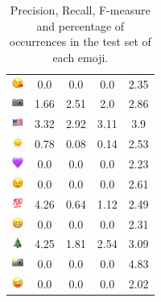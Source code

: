 \documentclass{article}
\begin{document}
\begin{table}
\begin{tabular}{|c|ccc|c|}
\includegraphics[height=0.37cm,width=0.37cm]{img/face_blowing_a_kiss.png} & 0.0 & 0.0 & 0.0 & 2.35\\ 
\includegraphics[height=0.37cm,width=0.37cm]{img/camera.png} & 1.66 & 2.51 & 2.0 & 2.86\\ 
\includegraphics[height=0.37cm,width=0.37cm]{img/United_States.png} & 3.32 & 2.92 & 3.11 & 3.9\\ 
\includegraphics[height=0.37cm,width=0.37cm]{img/sun.png} & 0.78 & 0.08 & 0.14 & 2.53\\ 
\includegraphics[height=0.37cm,width=0.37cm]{img/purple_heart.png} & 0.0 & 0.0 & 0.0 & 2.23\\ 
\includegraphics[height=0.37cm,width=0.37cm]{img/winking_face.png} & 0.0 & 0.0 & 0.0 & 2.61\\ 
\includegraphics[height=0.37cm,width=0.37cm]{img/hundred_points.png} & 4.26 & 0.64 & 1.12 & 2.49\\ 
\includegraphics[height=0.37cm,width=0.37cm]{img/beaming_face_with_smiling_eyes.png} & 0.0 & 0.0 & 0.0 & 2.31\\ 
\includegraphics[height=0.37cm,width=0.37cm]{img/Christmas_tree.png} & 4.25 & 1.81 & 2.54 & 3.09\\ 
\includegraphics[height=0.37cm,width=0.37cm]{img/camera_with_flash.png} & 0.0 & 0.0 & 0.0 & 4.83\\ 
\includegraphics[height=0.37cm,width=0.37cm]{img/winking_face_with_tongue.png} & 0.0 & 0.0 & 0.0 & 2.02\\ 

\hline
\end{tabular}
\caption{\label{table:emoji_detailed} Precision, Recall, F-measure and percentage of occurrences in the test set of each emoji.}
\end{table}
\end{document}
